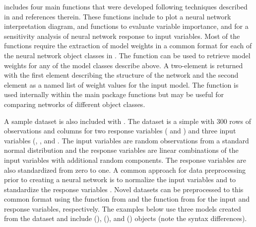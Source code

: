 \documentclass[article,shortnames]{jss}\usepackage[]{graphicx}\usepackage[]{color}
\begin{document}
 includes four main functions that were developed following techniques described in \citet{Olden02} and references therein.  These functions include  to plot a neural network interpretation diagram,  and  functions to evaluate variable importance, and  for a sensitivity analysis of neural network response to input variables.  Most of the functions require the extraction of model weights in a common format for each of the neural network object classes in .  The  function can be used to retrieve model weights for any of the model classes describe above.  A two-element  is returned with the first element describing the structure of the network and the second element as a named list of weight values for the input model.  The function is used internally within the main package functions but may be useful for comparing networks of different object classes.

A sample dataset is also included with .  The  dataset is a simple  with 300 rows of observations and columns for two response variables ( and ) and three input variables (, , and .  The input variables are random observations from a standard normal distribution and the response variables are linear combinations of the input variables with additional random components.  The response variables are also standardized from zero to one.  A common approach for data preprocessing prior to creating a neural network is to normalize the input variables and to standardize the response variables \citep{Lek00,Olden02}.  Novel datasets can be preprocessed to this common format using the  function from  and the  function from  for the input and response variables, respectively.  The examples below use three models created from the  dataset and include  (),  (), and  () objects (note the syntax differences).
\end{document}
